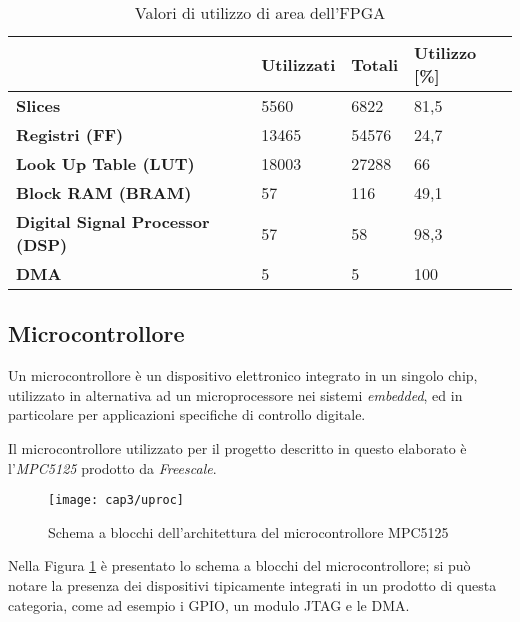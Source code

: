 \begin{table}[ht]
\centering
\begin{tabular}{l|l|l|l}
                                        & \textbf{Utilizzati} & \textbf{Totali} & \textbf{Utilizzo {[}\%{]}} \\ \hline
\textbf{Slices}                         & 5560                & 6822            & 81,5                                      \\
\textbf{Registri (FF)}                  & 13465               & 54576           & 24,7                                      \\
\textbf{Look Up Table (LUT)}            & 18003               & 27288           & 66                                        \\
\textbf{Block RAM (BRAM)}                      & 57                  & 116             & 49,1                                      \\
\textbf{Digital Signal Processor (DSP)} & 57                  & 58              & 98,3                                      \\
\textbf{DMA}                    & 5                   & 5               & 100                                      
\end{tabular}
\caption{Valori di utilizzo di area dell'FPGA}
\label{tabarea}
\end{table}

\subsection{Microcontrollore}
Un microcontrollore è un dispositivo elettronico integrato in un singolo chip, utilizzato in alternativa ad un microprocessore nei sistemi \textit{embedded}, ed in particolare per applicazioni specifiche di controllo digitale.

Il microcontrollore utilizzato per il progetto descritto in questo elaborato è l'\textit{MPC5125} prodotto da \textit{Freescale}. 

\begin{figure}[H]  
  \begin{center}
    \texttt{[image: cap3/uproc]}
    \caption{Schema a blocchi dell'architettura del microcontrollore MPC5125}
    \label{uproc}
  \end{center}
\end{figure}

Nella Figura \ref{uproc} è presentato lo schema a blocchi del microcontrollore; si può notare la presenza dei dispositivi tipicamente integrati in un prodotto di questa categoria, come ad esempio i GPIO, un modulo JTAG e le DMA.

